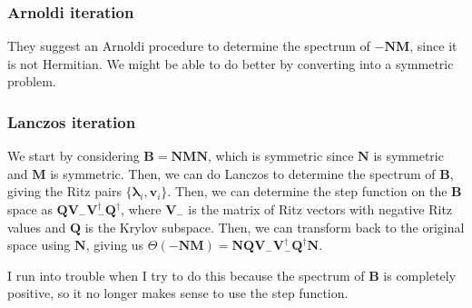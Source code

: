 \subsubsection{Arnoldi iteration}
They suggest an Arnoldi procedure to determine the spectrum of $-\bm{N}\bm{M}$, since it is not Hermitian. We might be able to do better by converting into a symmetric problem. 

\subsubsection{Lanczos iteration}
We start by considering $\bm{B} = \bm{N}\bm{M}\bm{N}$, which is symmetric since $\bm{N}$ is symmetric and $\bm{M}$ is symmetric. Then, we can do Lanczos to determine the spectrum of $\bm{B}$, giving the Ritz pairs $\{\bm{\lambda}_i, \bm{v}_i\}$. Then, we can determine the step function on the $\bm{B}$ space as $\bm{Q}\bm{V}_- \bm{V}_-^\dagger \bm{Q}^\dagger$, where $\bm{V}_-$ is the matrix of Ritz vectors with negative Ritz values and $\bm{Q}$ is the Krylov subspace. Then, we can transform back to the original space using $\bm{N}$, giving us $\Theta(-\bm{N}\bm{M})=\bm{N}\bm{Q}\bm{V}_- \bm{V}_-^\dagger \bm{Q}^\dagger\bm{N}$.
\begin{tcolorbox}[colback=red!10!white, colframe=red!50!black]
 I run into trouble when I try to do this because the spectrum of $\bm{B}$ is completely positive, so it no longer makes sense to use the step function.
\end{tcolorbox}
